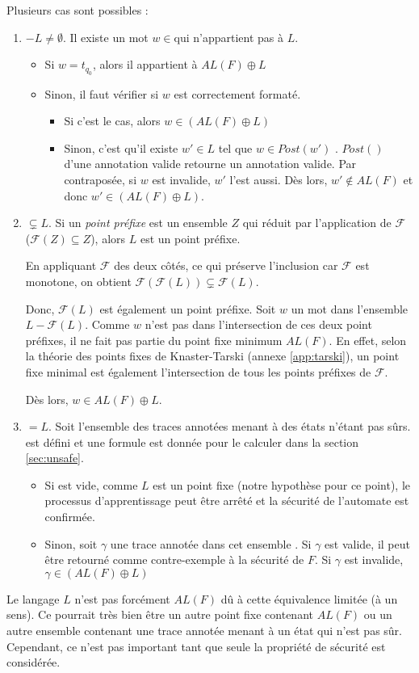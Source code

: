 Plusieurs cas sont possibles :
\begin{enumerate}
  \item \fl$-L\neq\emptyset$. Il existe un mot $w\in$\fl qui n'appartient pas à $L$.
  \begin{itemize}
    \item Si $w=t_{q_0}$, alors il appartient à $AL(F)\oplus L$
    \item Sinon, il faut vérifier si $w$ est correctement formaté.
      \begin{itemize}
          \item Si c'est le cas, alors $w\in(AL(F)\oplus L)$
          \item Sinon, c'est qu'il existe $w'\in L$ tel que $w\in Post(w')$ . $Post()$ d'une annotation valide retourne un annotation valide. Par contraposée, si $w$ est invalide, $w'$ l'est aussi. Dès lors, $w'\notin AL(F)$ et donc $w'\in(AL(F)\oplus L)$.
      \end{itemize}
  \end{itemize}
  \item \fl$\subsetneq L$. Si un \emph{point préfixe} est un ensemble $Z$ qui réduit par l'application de $\mathcal{F}$ ($\mathcal{F}(Z)\subseteq Z$), alors $L$ est un point préfixe.

   En appliquant $\mathcal{F}$ des deux côtés, ce qui préserve l'inclusion car $\mathcal{F}$ est monotone, on obtient $\mathcal{F}(\mathcal{F}(L))\subsetneq\mathcal{F}(L)$.

   Donc, $\mathcal{F}(L)$ est également un point préfixe. Soit $w$ un mot dans l'ensemble $L-\mathcal{F}(L)$. Comme $w$ n'est pas dans l'intersection de ces deux point préfixes, il ne fait pas partie du point fixe minimum $AL(F)$. En effet, selon la théorie des points fixes de Knaster-Tarski (annexe \ref{app:tarski}), un point fixe minimal est également l'intersection de tous les points préfixes de $\mathcal{F}$.

   Dès lors, $w\in AL(F)\oplus L$.
  \item \fl$=L$. Soit \wl l'ensemble des traces annotées menant à des états n'étant pas sûrs. \wl est défini et une formule est donnée pour le calculer dans la section \ref{sec:unsafe}.
  \begin{itemize}
    \item Si \wl est vide, comme $L$ est un point fixe (notre hypothèse pour ce point), le processus d'apprentissage peut être arrêté et la sécurité de l'automate est confirmée.
    \item Sinon, soit $\gamma$ une trace annotée dans cet ensemble \wl. Si $\gamma$ est valide, il peut être retourné comme contre-exemple à la sécurité de $F$. Si $\gamma$ est invalide, $\gamma\in(AL(F)\oplus L)$
  \end{itemize}
\end{enumerate}

Le langage $L$ n'est pas forcément $AL(F)$ dû à cette équivalence limitée (à un sens). Ce pourrait très bien être un autre point fixe contenant $AL(F)$ ou un autre ensemble contenant une trace annotée menant à un état qui n'est pas sûr. Cependant, ce n'est pas important tant que seule la propriété de sécurité est considérée.
